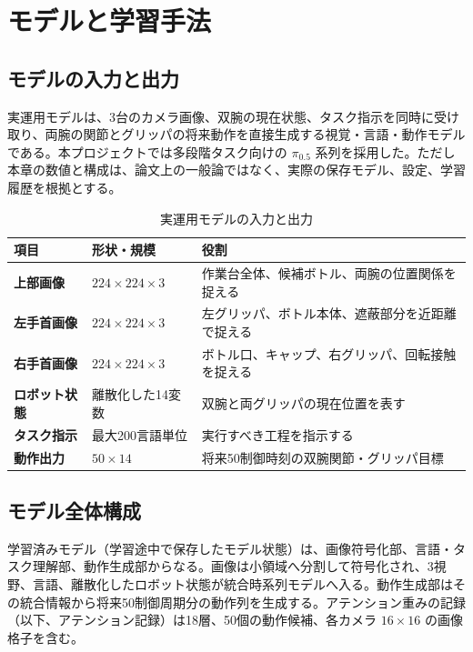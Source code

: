 \chapter{モデルと学習手法}

\section{モデルの入力と出力}

実運用モデルは、3台のカメラ画像、双腕の現在状態、タスク指示を同時に受け取り、両腕の関節とグリッパの将来動作を直接生成する視覚・言語・動作モデルである。本プロジェクトでは多段階タスク向けの $\pi_{0.5}$ 系列を採用した\cite{pi05_2025}。ただし本章の数値と構成は、論文上の一般論ではなく、実際の保存モデル、設定、学習履歴を根拠とする。


\begin{table}[H]
\centering
\caption{実運用モデルの入力と出力}
\begin{tabularx}{\textwidth}{>{\bfseries}p{31mm}p{34mm}X}
\toprule
項目 & 形状・規模 & 役割\\
\midrule
上部画像 & $224\times224\times3$ & 作業台全体、候補ボトル、両腕の位置関係を捉える\\
左手首画像 & $224\times224\times3$ & 左グリッパ、ボトル本体、遮蔽部分を近距離で捉える\\
右手首画像 & $224\times224\times3$ & ボトル口、キャップ、右グリッパ、回転接触を捉える\\
ロボット状態 & 離散化した14変数 & 双腕と両グリッパの現在位置を表す\\
タスク指示 & 最大200言語単位 & 実行すべき工程を指示する\\
動作出力 & $50\times14$ & 将来50制御時刻の双腕関節・グリッパ目標\\
\bottomrule
\end{tabularx}
\end{table}

\section{モデル全体構成}

学習済みモデル（学習途中で保存したモデル状態）は、画像符号化部、言語・タスク理解部、動作生成部からなる。画像は小領域へ分割して符号化され、3視野、言語、離散化したロボット状態が統合時系列モデルへ入る。動作生成部はその統合情報から将来50制御周期分の動作列を生成する。アテンション重みの記録（以下、アテンション記録）は18層、50個の動作候補、各カメラ $16\times16$ の画像格子を含む。

